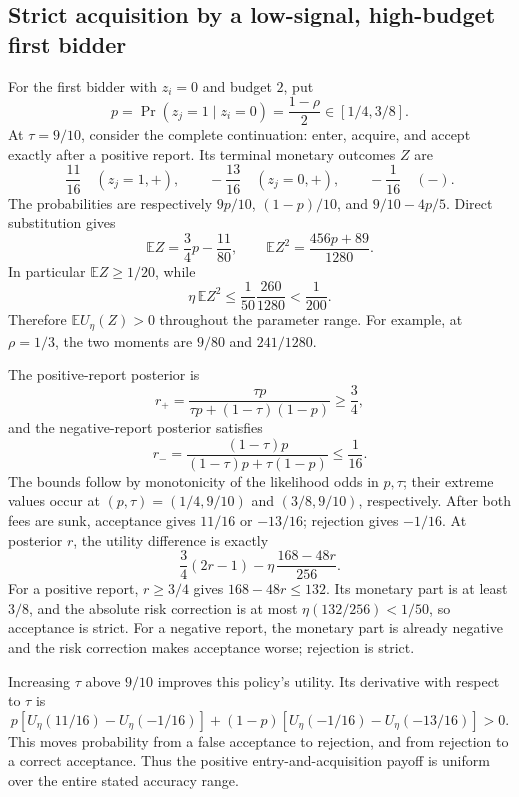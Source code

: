 \documentclass[11pt,a4paper]{article}
\numberwithin{equation}{section}
\theoremstyle{definition}
\newcommand{\E}{\mathbb E}
\begin{document}
\subsection{Strict acquisition by a low-signal, high-budget first bidder}
For the first bidder with \(z_i=0\) and budget \(2\), put
\[
 p=\Pr(z_j=1\mid z_i=0)=\frac{1-\rho}{2}\in[1/4,3/8].
\]
At \(\tau=9/10\), consider the complete continuation:
enter, acquire, and accept exactly after a positive report.
Its terminal monetary outcomes \(Z\) are
\[
 \frac{11}{16}\quad(z_j=1,+),\qquad
 -\frac{13}{16}\quad(z_j=0,+),\qquad
 -\frac1{16}\quad(-).
\]
The probabilities are respectively \(9p/10\),
\((1-p)/10\), and \(9/10-4p/5\).
Direct substitution gives
\begin{equation}\label{eq:acquisitionmoments}
 \E Z=\frac34p-\frac{11}{80},\qquad
 \E Z^2=\frac{456p+89}{1280}.
\end{equation}
In particular \(\E Z\ge1/20\), while
\[
 \eta\,\E Z^2
 \le\frac1{50}\frac{260}{1280}<\frac1{200}.
\]
Therefore \(\E U_\eta(Z)>0\) throughout the parameter range.
For example, at \(\rho=1/3\), the two moments are
\(9/80\) and \(241/1280\).

The positive-report posterior is
\[
 r_+=\frac{\tau p}{\tau p+(1-\tau)(1-p)}\ge\frac34,
\]
and the negative-report posterior satisfies
\[
 r_-=\frac{(1-\tau)p}{(1-\tau)p+\tau(1-p)}\le\frac1{16}.
\]
The bounds follow by monotonicity of the likelihood odds in \(p,\tau\);
their extreme values occur at
\((p,\tau)=(1/4,9/10)\) and \((3/8,9/10)\), respectively.
After both fees are sunk, acceptance gives \(11/16\) or \(-13/16\);
rejection gives \(-1/16\).
At posterior \(r\), the utility difference is exactly
\[
 \frac34(2r-1)-\eta\,\frac{168-48r}{256}.
\]
For a positive report, \(r\ge3/4\) gives \(168-48r\le132\). Its monetary
part is at least \(3/8\), and the absolute risk correction is at most
\(\eta(132/256)<1/50\), so acceptance is strict.
For a negative report, the monetary part is already negative and
the risk correction makes acceptance worse; rejection is strict.

Increasing \(\tau\) above \(9/10\) improves this policy's utility.
Its derivative with respect to \(\tau\) is
\[
 p[U_\eta(11/16)-U_\eta(-1/16)]
 +(1-p)[U_\eta(-1/16)-U_\eta(-13/16)]>0.
\]
This moves probability from a false acceptance to rejection, and
from rejection to a correct acceptance.
Thus the positive entry-and-acquisition payoff is uniform over
the entire stated accuracy range.
\end{document}
